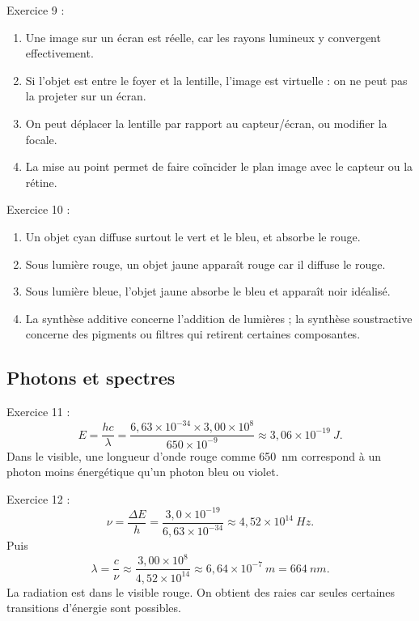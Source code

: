 \documentclass[11pt,a4paper]{article}
\begin{document}
\begin{corrbox}
Exercice 9 :
\begin{enumerate}[label=\alph*)]
    \item Une image sur un écran est réelle, car les rayons lumineux y convergent effectivement.
    \item Si l'objet est entre le foyer et la lentille, l'image est virtuelle : on ne peut pas la projeter sur un écran.
    \item On peut déplacer la lentille par rapport au capteur/écran, ou modifier la focale.
    \item La mise au point permet de faire coïncider le plan image avec le capteur ou la rétine.
\end{enumerate}
\end{corrbox}

\begin{corrbox}
Exercice 10 :
\begin{enumerate}[label=\alph*)]
    \item Un objet cyan diffuse surtout le vert et le bleu, et absorbe le rouge.
    \item Sous lumière rouge, un objet jaune apparaît rouge car il diffuse le rouge.
    \item Sous lumière bleue, l'objet jaune absorbe le bleu et apparaît noir idéalisé.
    \item La synthèse additive concerne l'addition de lumières ; la synthèse soustractive concerne des pigments ou filtres qui retirent certaines composantes.
\end{enumerate}
\end{corrbox}

\subsection*{Photons et spectres}
\begin{corrbox}
Exercice 11 :
\[
E=\frac{hc}{\lambda}=\frac{6{,}63\times10^{-34}\times 3{,}00\times10^8}{650\times10^{-9}}
\approx 3{,}06\times10^{-19}\ \si{J}.
\]
Dans le visible, une longueur d'onde rouge comme \SI{650}{nm} correspond à un photon moins énergétique qu'un photon bleu ou violet.
\end{corrbox}

\begin{corrbox}
Exercice 12 :
\[
\nu=\frac{\Delta E}{h}=\frac{3{,}0\times10^{-19}}{6{,}63\times10^{-34}}\approx 4{,}52\times10^{14}\ \si{Hz}.
\]
Puis
\[
\lambda = \frac{c}{\nu}\approx \frac{3{,}00\times10^8}{4{,}52\times10^{14}}\approx 6{,}64\times10^{-7}\ \si{m}=\SI{664}{nm}.
\]
La radiation est dans le visible rouge. On obtient des raies car seules certaines transitions d'énergie sont possibles.
\end{corrbox}
\end{document}
